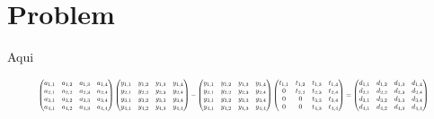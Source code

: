 \documentclass[]{article}
\title{}
\author{}
\begin{document}
\maketitle

\begin{abstract}

\end{abstract}

\section{Problem}

Aqui


\begin{equation}
\resizebox{.9\hsize}{!}{$
	\begin{pmatrix}
	a_{1,1} & a_{1,2} & a_{1,3}  & a_{1,4} \\
	a_{2,1} & a_{2,2} & a_{2,3}  & a_{2,4} \\
	a_{3,1} & a_{3,2} & a_{3,3}  & a_{3,4} \\
	a_{4,1} & a_{4,2} & a_{4,3}  & a_{4,4} \\
	\end{pmatrix}
	\begin{pmatrix}
	y_{1,1} & y_{1,2} & y_{1,3}  & y_{1,4} \\
	y_{2,1} & y_{2,2} & y_{2,3}  & y_{2,4} \\
	y_{3,1} & y_{3,2} & y_{3,3}  & y_{3,4} \\
	y_{4,1} & y_{4,2} & y_{4,3}  & y_{4,4} \\
	\end{pmatrix}
	-
	\begin{pmatrix}
	y_{1,1} & y_{1,2} & y_{1,3}  & y_{1,4} \\
	y_{2,1} & y_{2,2} & y_{2,3}  & y_{2,4} \\
	y_{3,1} & y_{3,2} & y_{3,3}  & y_{3,4} \\
	y_{4,1} & y_{4,2} & y_{4,3}  & y_{4,4} \\
	\end{pmatrix}
	\begin{pmatrix}
	t_{1,1} & t_{1,2} & t_{1,3}  & t_{1,4} \\
	0 & t_{2,2} & t_{2,3}  & t_{2,4} \\
	0 & 0 & t_{3,3}  & t_{3,4} \\
	0 & 0 & t_{4,3}  & t_{4,4} \\
	\end{pmatrix}
	=
	\begin{pmatrix}
	d_{1,1} & d_{1,2} & d_{1,3}  & d_{1,4} \\
	d_{2,1} & d_{2,2} & d_{2,3}  & d_{2,4} \\
	d_{3,1} & d_{3,2} & d_{3,3}  & d_{3,4} \\
	d_{4,1} & d_{4,2} & d_{4,3}  & d_{4,4} \\
	\end{pmatrix}
	$}
\end{equation}
\end{document}
